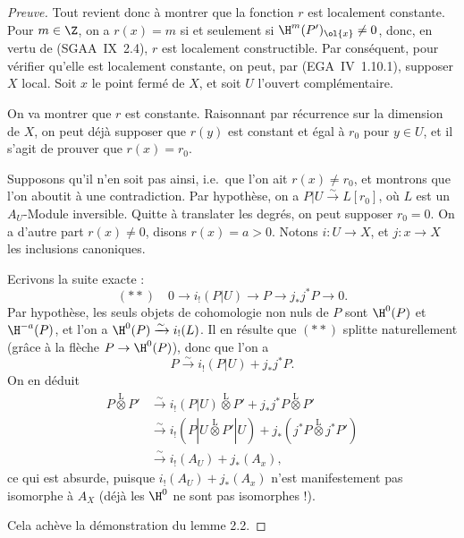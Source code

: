 \begin{proof}[Preuve]
Tout revient donc à montrer que la fonction $r$ est localement constante. Pour $m \in \Z$, on a $r(x) = m$ si et seulement si $\H^{m}(P')_{\ol{x}} \neq 0$, donc, en vertu de (SGAA~IX~2.4), $r$ est localement constructible. Par conséquent, pour vérifier qu'elle est localement constante, on peut, par (EGA~IV~1.10.1), supposer $X$ local. Soit $x$ le point fermé de $X$, et soit $U$ l'ouvert complémentaire.

On va montrer que $r$ est constante. Raisonnant par récurrence sur la dimension de $X$, on peut déjà supposer que $r(y)$ est constant et égal à $r_0$ pour $y \in U$, et il s'agit de prouver que $r(x) = r_0$.

Supposons qu'il n'en soit pas ainsi, i.e.~que l'on ait $r(x) \neq r_0$, et montrons que l'on aboutit à une contradiction. Par hypothèse, on a $P|U \xrightarrow{\sim} L[r_0]$, où $L$ est un $A_U$-Module inversible. Quitte à translater les degrés, on peut supposer $r_0 = 0$. On a d'autre part $r(x) \neq 0$, disons $r(x) = a > 0$. Notons $i : U \to X$, et $j : x \to X$ les inclusions canoniques.

Ecrivons la suite exacte :
\[
(**) \quad 0 \longrightarrow i_{!}(P|U) \longrightarrow P \longrightarrow j_{*}j^{*}P \longrightarrow 0.
\]
Par hypothèse, les seuls objets de cohomologie non nuls de $P$ sont $\H^{0}(P)$ et $\H^{-a}(P)$, et l'on a $\H^{0}(P) \xrightarrow{\sim} i_{!}(L)$. Il en résulte que $(**)$ splitte naturellement (grâce à la flèche $P \to \H^{0}(P)$), donc que l'on a
\[
P \xrightarrow{\sim} i_{!}(P|U) + j_{*}j^{*}P.
\]
On en déduit
\begin{align*}
P \mathop{\otimes}\limits^{\mathrm{L}} P' &\xrightarrow{\sim} i_{!}(P|U) \mathop{\otimes}\limits^{\mathrm{L}} P' + j_{*}j^{*}P \mathop{\otimes}\limits^{\mathrm{L}} P' \\
&\xrightarrow{\sim} i_{!}(P|U \mathop{\otimes}\limits^{\mathrm{L}} P'|U) + j_{*}(j^{*}P \mathop{\otimes}\limits^{\mathrm{L}} j^{*}P') \\
&\xrightarrow{\sim} i_{!}(A_U) + j_{*}(A_x),
\end{align*}
ce qui est absurde, puisque $i_{!}(A_U) + j_{*}(A_x)$ n'est manifestement pas isomorphe à $A_X$ (déjà les $\H^{0}$ ne sont pas isomorphes !).

Cela achève la démonstration du lemme 2.2.
\end{proof}

